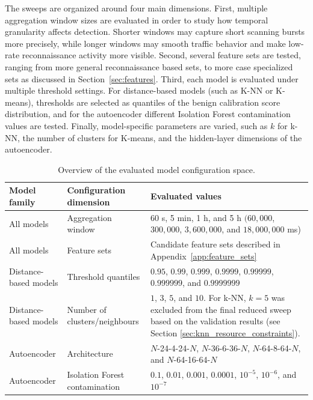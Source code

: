 The sweeps are organized around four main dimensions. First, multiple aggregation window sizes are evaluated in order to study how temporal granularity affects detection. Shorter windows may capture short scanning bursts more precisely, while longer windows may smooth traffic behavior and make low-rate reconnaissance activity more visible. Second, several feature sets are tested, ranging from more general reconnaissance based sets, to more case specialized sets as discussed in Section~\ref{sec:features}. Third, each model is evaluated under multiple threshold settings. For distance-based models (such as K-NN or K-means), thresholds are selected as quantiles of the benign calibration score distribution, and for the autoencoder different Isolation Forest contamination values are tested. Finally, model-specific parameters are varied, such as \(k\) for k-NN, the number of clusters for K-means, and the hidden-layer dimensions of the autoencoder.

\begin{table}[h]
\centering
\caption{Overview of the evaluated model configuration space.}
\renewcommand{\arraystretch}{1.35}
\setlength{\tabcolsep}{6pt}
\begin{tabular}{p{} p{} p{}}
\toprule
Model family & Configuration dimension & Evaluated values \\
\midrule

All models
& Aggregation window
& 60 s, 5 min, 1 h, and 5 h
  \newline $(60{,}000$, $300{,}000$, $3{,}600{,}000$, and $18{,}000{,}000$ ms) \\

\addlinespace

All models
& Feature sets
& Candidate feature sets described in Appendix~\ref{app:feature_sets} \\

\addlinespace

Distance-based models
& Threshold quantiles
& $0.95$, $0.99$, $0.999$, $0.9999$, $0.99999$, $0.999999$, and $0.9999999$ \\

\addlinespace

Distance-based models
& Number of clusters/neighbours
& $1$, $3$, $5$, and $10$. For k-NN, $k=5$ was excluded from the final reduced sweep based on the validation results (see Section \ref{sec:knn_resource_constraints}). \\

\addlinespace

Autoencoder
& Architecture
& $N$-24-4-24-$N$, $N$-36-6-36-$N$, $N$-64-8-64-$N$, and $N$-64-16-64-$N$ \\

\addlinespace

Autoencoder
& Isolation Forest contamination
& $0.1$, $0.01$, $0.001$, $0.0001$, $10^{-5}$, $10^{-6}$, and $10^{-7}$ \\

\bottomrule
\end{tabular}

\label{tab:sweep_configuration}
\end{table}


